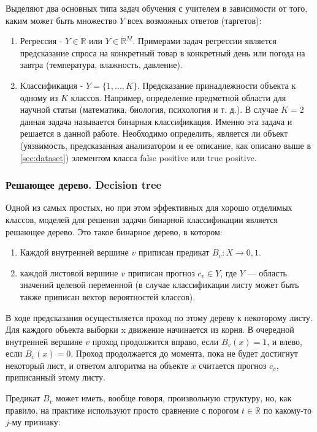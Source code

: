Выделяют два основных типа задач обучения с учителем в зависимости от того, каким может быть множество $Y$ всех возможных ответов (таргетов):

\begin{enumerate}
    \item Регрессия - $Y \in \mathbb{R}$ или $Y \in \mathbb{R}^M$. Примерами задач регрессии является предсказание спроса на конкретный товар в конкретный день или погода на завтра (температура, влажность, давление).
    \item Классификация - $Y = \{1,...,K\}$. Предсказание принадлежности объекта к одному из $K$ классов. Например, определение предметной области для научной статьи (математика, биология, психология и т. д.). В случае $K = 2$ данная задача называется бинарная классификация. Именно эта задача и решается в данной работе. Необходимо определить, является ли объект (уязвимость, предсказанная анализатором и ее описание, как описано выше в \ref{sec:dataset}) элементом класса false positive или true positive.
\end{enumerate}

\subsubsection{Решающее дерево. Decision tree}
Одной из самых простых, но при этом эффективных для хорошо отделимых классов, моделей для решения задачи бинарной классификации является решающее дерево. Это такое бинарное дерево, в котором:
\begin{enumerate}
    \item Каждой внутренней вершине $v$ приписан предикат $B_v: X \rightarrow {0, 1}$.
    \item каждой листовой вершине $v$ приписан прогноз $c_v \in Y$, где $Y$ — область значений целевой переменной (в случае классификации листу может быть также приписан вектор вероятностей классов).
\end{enumerate}

В ходе предсказания осуществляется проход по этому дереву к некоторому листу. Для каждого объекта выборки x движение начинается из корня. В очередной внутренней вершине $v$ проход продолжится вправо, если $B_v(x)=1$, и влево, если $B_v(x)=0$. Проход продолжается до момента, пока не будет достигнут некоторый лист, и ответом алгоритма на объекте $x$ считается прогноз $c_v$, приписанный этому листу\cite{SHAD-trees}.

Предикат $B_v$ может иметь, вообще говоря, произвольную структуру, но, как правило, на практике используют просто сравнение с порогом $t \in \mathbb{R}$ по какому-то $j$-му признаку:

